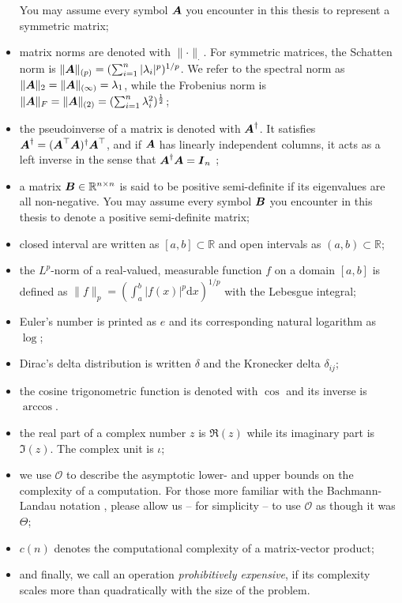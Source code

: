 \begin{itemize}
          You may assume every symbol $\boldsymbol{A}$ you encounter in this thesis to
          represent a symmetric matrix;
    \item matrix norms are denoted with $\lVert \cdot \rVert _{\cdot}$.
          For symmetric matrices, the Schatten norm is
          $\lVert \boldsymbol{A} \rVert _{(p)} = (\sum_{i=1}^n |\lambda_i|^p)^{1/p}$.
          We refer to the spectral norm as
          $\lVert \boldsymbol{A} \rVert _2 = \lVert \boldsymbol{A} \rVert _{(\infty)} = \lambda_1$, while the Frobenius norm
          is $\lVert \boldsymbol{A} \rVert _F = \lVert \boldsymbol{A} \rVert _{(2)} = (\sum_{i=1}^{n} \lambda_i^2)^{\frac{1}{2}}$;
    \item the pseudoinverse of a matrix is denoted with $\boldsymbol{A}^{\dagger}$. It
          satisfies $\boldsymbol{A}^{\dagger}=(\boldsymbol{A}^{\top} \boldsymbol{A})^{\dagger} \boldsymbol{A}^{\top}$,
          and if $\boldsymbol{A}$ has linearly independent columns, it acts as a left inverse
          in the sense that $\boldsymbol{A}^{\dagger} \boldsymbol{A} = \boldsymbol{I}_n$ \cite{penrose1955pseudo};
    \item a matrix $\boldsymbol{B} \in \mathbb{R}^{n \times n}$ is said to be positive
          semi-definite if its eigenvalues are all non-negative. You may assume every
          symbol $\boldsymbol{B}$ you encounter in this thesis to denote a positive
          semi-definite matrix;
    \item closed interval are written as $[a, b] \subset \mathbb{R}$ and open
          intervals as $(a, b) \subset \mathbb{R}$;
    \item the $L^p$-norm of a real-valued, measurable function $f$ on a
          domain $[a, b]$ is defined as
          $\lVert f \rVert _{p} = (\int_{a}^{b} |f(x)|^p \mathrm{d}x)^{1/p}$ with the Lebesgue integral;
    \item Euler's number is printed as $e$ and its corresponding natural logarithm as $\log$;
    \item Dirac's delta distribution is written $\delta$ \cite[chapter~15]{dirac1947quantum}
          and the Kronecker delta $\delta_{ij}$;
    \item the cosine trigonometric function is denoted with $\cos$ and its inverse is $\arccos$.
    \item the real part of a complex number $z$ is $\Re(z)$ while its imaginary part is $\Im(z)$.
          The complex unit is $\iota$;
    \item we use $\mathcal{O}$ to describe the asymptotic lower- and upper bounds
          on the complexity of a computation. For those more familiar with the
          Bachmann-Landau notation \cite[section~3.2]{cormen2009algorithms},
          please allow us -- for simplicity -- to use $\mathcal{O}$ as though it was $\Theta$;
    \item $c(n)$ denotes the computational complexity of a matrix-vector product;
    \item and finally, we call an operation \emph{prohibitively expensive}, if its
          complexity scales more than quadratically with the size of the problem.
\end{itemize}

